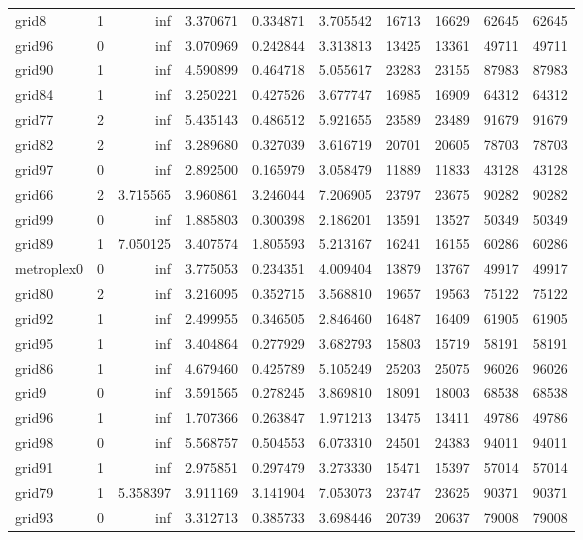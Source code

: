 \begin{longtable}{|l|r|r|r|r|r|r|r|r|r|}
grid8 & 1 & inf & 3.370671 & 0.334871 & 3.705542 & 16713 & 16629 & 62645 & 62645 \\
grid96 & 0 & inf & 3.070969 & 0.242844 & 3.313813 & 13425 & 13361 & 49711 & 49711 \\
grid90 & 1 & inf & 4.590899 & 0.464718 & 5.055617 & 23283 & 23155 & 87983 & 87983 \\
grid84 & 1 & inf & 3.250221 & 0.427526 & 3.677747 & 16985 & 16909 & 64312 & 64312 \\
grid77 & 2 & inf & 5.435143 & 0.486512 & 5.921655 & 23589 & 23489 & 91679 & 91679 \\
grid82 & 2 & inf & 3.289680 & 0.327039 & 3.616719 & 20701 & 20605 & 78703 & 78703 \\
grid97 & 0 & inf & 2.892500 & 0.165979 & 3.058479 & 11889 & 11833 & 43128 & 43128 \\
grid66 & 2 & 3.715565 & 3.960861 & 3.246044 & 7.206905 & 23797 & 23675 & 90282 & 90282 \\
grid99 & 0 & inf & 1.885803 & 0.300398 & 2.186201 & 13591 & 13527 & 50349 & 50349 \\
grid89 & 1 & 7.050125 & 3.407574 & 1.805593 & 5.213167 & 16241 & 16155 & 60286 & 60286 \\
metroplex0 & 0 & inf & 3.775053 & 0.234351 & 4.009404 & 13879 & 13767 & 49917 & 49917 \\
grid80 & 2 & inf & 3.216095 & 0.352715 & 3.568810 & 19657 & 19563 & 75122 & 75122 \\
grid92 & 1 & inf & 2.499955 & 0.346505 & 2.846460 & 16487 & 16409 & 61905 & 61905 \\
grid95 & 1 & inf & 3.404864 & 0.277929 & 3.682793 & 15803 & 15719 & 58191 & 58191 \\
grid86 & 1 & inf & 4.679460 & 0.425789 & 5.105249 & 25203 & 25075 & 96026 & 96026 \\
grid9 & 0 & inf & 3.591565 & 0.278245 & 3.869810 & 18091 & 18003 & 68538 & 68538 \\
grid96 & 1 & inf & 1.707366 & 0.263847 & 1.971213 & 13475 & 13411 & 49786 & 49786 \\
grid98 & 0 & inf & 5.568757 & 0.504553 & 6.073310 & 24501 & 24383 & 94011 & 94011 \\
grid91 & 1 & inf & 2.975851 & 0.297479 & 3.273330 & 15471 & 15397 & 57014 & 57014 \\
grid79 & 1 & 5.358397 & 3.911169 & 3.141904 & 7.053073 & 23747 & 23625 & 90371 & 90371 \\
grid93 & 0 & inf & 3.312713 & 0.385733 & 3.698446 & 20739 & 20637 & 79008 & 79008 \\

\end{longtable}
